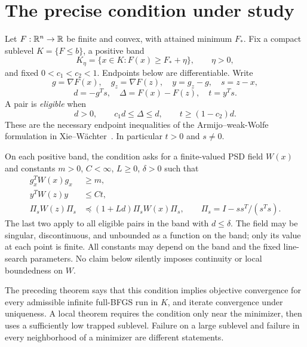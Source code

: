 \documentclass[10pt,oneside,openany]{book}
\theoremstyle{remark}\newtheorem{remark}{Remark}[chapter]
\begin{document}
\section{The precise condition under study}
Let $F:\mathbb R^n\to\mathbb R$ be finite and convex, with attained minimum $F_*$. Fix a compact sublevel $K=\{F\le b\}$, a positive band
\[
 K_\eta=\{x\in K:F(x)\ge F_*+\eta\},\qquad \eta>0,
\]
and fixed $0<c_1<c_2<1$. Endpoints below are differentiable. Write
\[
 g=\nabla F(x),\quad g_z=\nabla F(z),\quad y=g_z-g,\quad s=z-x,
\]
\[
 d=-g^Ts,\quad \Delta=F(x)-F(z),\quad t=y^Ts.
\]
A pair is \emph{eligible} when
\begin{equation}
 d>0,\qquad c_1d\le\Delta\le d,\qquad t\ge(1-c_2)d. \tag{G.E}
\end{equation}
These are the necessary endpoint inequalities of the Armijo--weak-Wolfe formulation in Xie--W\"achter~\cite{XW}. In particular $t>0$ and $s\ne0$.

On each positive band, the condition asks for a finite-valued PSD field $W(x)$ and constants $m>0$, $C<\infty$, $L\ge0$, $\delta>0$ such that
\begin{align}
 g_x^TW(x)g_x&\ge m, \tag{G.V}\\
 y^TW(z)y&\le Ct, \tag{G.S}\\
 \Pi_sW(z)\Pi_s&\preceq(1+Ld)\Pi_sW(x)\Pi_s,
 \qquad \Pi_s=I-ss^T/(s^Ts). \tag{G.T}
\end{align}
The last two apply to all eligible pairs in the band with $d\le\delta$. The field may be singular, discontinuous, and unbounded as a function on the band; only its value at each point is finite. All constants may depend on the band and the fixed line-search parameters. No claim below silently imposes continuity or local boundedness on $W$.

The preceding theorem says that this condition implies objective convergence for every admissible infinite full-BFGS run in $K$, and iterate convergence under uniqueness. A local theorem requires the condition only near the minimizer, then uses a sufficiently low trapped sublevel. Failure on a large sublevel and failure in every neighborhood of a minimizer are different statements.


\setcounter{section}{1}
\setcounter{theorem}{0}
\setcounter{equation}{1}
\end{document}
